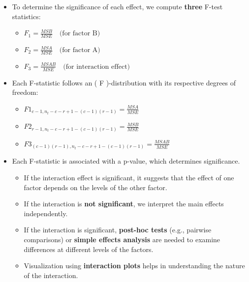 \documentclass[
  letterpaper,
  DIV=11,
  numbers=noendperiod]{scrreprt}
\providecommand{\tightlist}{%
  \setlength{\itemsep}{0pt}\setlength{\parskip}{0pt}}\usepackage{longtable,booktabs,array}
\begin{document}
\begin{itemize}
\item
  To determine the significance of each effect, we compute
  \textbf{three} F-test statistics:

  \begin{itemize}
  \tightlist
  \item
    \(F_1 = \frac{MSB}{MSE} \quad \text{(for factor B)}\)
  \item
    \(F_2 = \frac{MSA}{MSE} \quad \text{(for factor A)}\)\\
  \item
    \(F_3 = \frac{MSAB}{MSE} \quad \text{(for interaction effect)}\)
  \end{itemize}
\item
  Each F-statistic follows an ( F )-distribution with its respective
  degrees of freedom:

  \begin{itemize}
  \tightlist
  \item
    \(F1_{c-1,n_t-c-r+1-(c-1)(r-1)} = \frac{MSA}{MSE}\)
  \item
    \(F2_{r-1,n_t-c-r+1-(c-1)(r-1)} = \frac{MSB}{MSE}\)
  \item
    \(F3_{(c-1)(r-1),n_t-c-r+1-(c-1)(r-1)} = \frac{MSAB}{MSE}\)
  \end{itemize}
\item
  Each F-statistic is associated with a p-value, which determines
  significance.

  \begin{itemize}
  \tightlist
  \item
    If the interaction effect is significant, it suggests that the
    effect of one factor depends on the levels of the other factor.\\
  \item
    If the interaction is \textbf{not significant}, we interpret the
    main effects independently.\\
  \item
    If the interaction is significant, \textbf{post-hoc tests} (e.g.,
    pairwise comparisons) or \textbf{simple effects analysis} are needed
    to examine differences at different levels of the factors.\\
  \item
    Visualization using \textbf{interaction plots} helps in
    understanding the nature of the interaction.
  \end{itemize}
\end{itemize}
\end{document}
